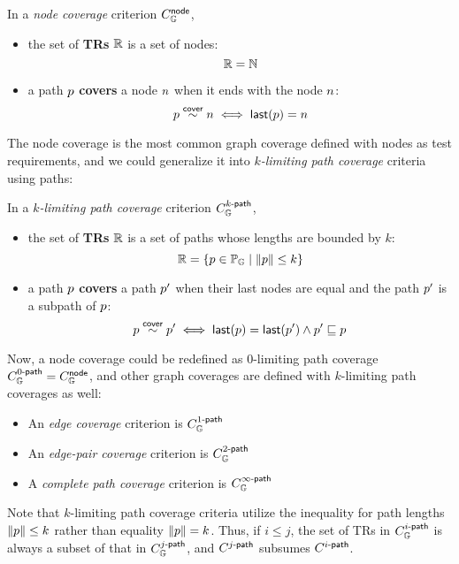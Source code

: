 
\begin{definition}\label{def:node-cov} In a \textit{node
  coverage} criterion $C_{\mathbb{G}}^{\textsf{node}}$,
  \begin{itemize}
    \item the set of \textbf{TRs} $\mathbb{R}$ is a set of nodes:
      \[
        \mathbb{R} = \mathbb{N}
      \]
    \item a path $p$ \textbf{covers} a node $n$ when it ends with the
      node $n$:
      \[
        p \overset{\textsf{cover}}{\sim} n \iff \textsf{last}(p) = n
      \]
  \end{itemize}
\end{definition}


The node coverage is the most common graph coverage defined with nodes as test
requirements, and we could generalize it into \textit{$k$-limiting path
coverage} criteria using paths:


\begin{definition}\label{def:k-path-cov}
  In a \textit{$k$-limiting path coverage} criterion $C_{\mathbb{G}}^{{k}\textsf{-path}}$,
  \begin{itemize}
    \item the set of \textbf{TRs} $\mathbb{R}$ is a set of
      paths whose lengths are bounded by $k$:
      \[
        \mathbb{R} = \{ p \in \mathbb{P}_{\mathbb{G}} \mid \lVert{p}\rVert \leq k \}
      \]
    \item a path $p$ \textbf{covers} a path $p'$ when their last nodes are
      equal and the path $p'$ is a subpath of $p$:
      \[
        p \overset{\textsf{cover}}{\sim} p'
        \iff
        \textsf{last}(p) = \textsf{last}(p') \wedge p' \sqsubseteq p
      \]
  \end{itemize}
\end{definition}


Now, a node coverage could be redefined as $0$-limiting path coverage
$C_{\mathbb{G}}^{{0}\textsf{-path}} = C_{\mathbb{G}}^{\textsf{node}}$, and other graph coverages are defined
with $k$-limiting path coverages as well:
\begin{itemize}
  \item An \textit{edge coverage} criterion is
    $C_{\mathbb{G}}^{{1}\textsf{-path}}$ 
  \item An \textit{edge-pair coverage} criterion is
    $C_{\mathbb{G}}^{{2}\textsf{-path}}$ 
  \item A \textit{complete path coverage} criterion is
    $C_{\mathbb{G}}^{{\infty}\textsf{-path}}$
\end{itemize}
%
Note that $k$-limiting path coverage criteria utilize the inequality for path
lengths $\lVert{p}\rVert \leq k$ rather than equality $\lVert{p}\rVert = k$.
%
Thus, if $i \leq j$, the set of TRs in $C_{\mathbb{G}}^{{i}\textsf{-path}}$ is always a subset
of that in $C_{\mathbb{G}}^{{j}\textsf{-path}}$, and $C_{}^{{j}\textsf{-path}}$ subsumes
$C_{}^{{i}\textsf{-path}}$.

